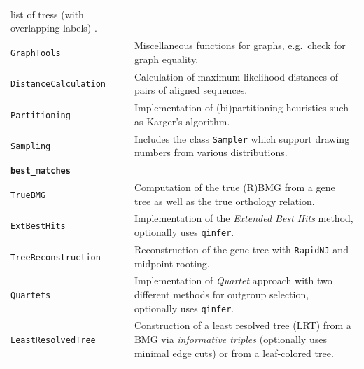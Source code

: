 \documentclass[hidelinks,11pt]{article}
\begin{document}
{\begin{longtable}{| p{4.0cm} | p{10cm} |}
	list of tress (with overlapping labels) \citep{deng2016}. \\
	\texttt{GraphTools} &
	Miscellaneous functions for graphs, e.g.\ check for graph equality. \\
	\texttt{DistanceCalculation} &
	Calculation of maximum likelihood distances of pairs of aligned sequences. \\
  \texttt{Partitioning} &
  Implementation of (bi)partitioning heuristics such as Karger's algorithm. \\
  \texttt{Sampling} &
  Includes the class \texttt{Sampler} which support drawing numbers from 
  various distributions. \\
	\hline
	\multicolumn{2}{|l|}{\textbf{\texttt{best\_matches}}}\\
	\hline
	\texttt{TrueBMG} &
	Computation of the true (R)BMG from a gene tree as well as the true orthology relation. \\
	\texttt{ExtBestHits} &
	Implementation of the \emph{Extended Best Hits} method, optionally uses \texttt{qinfer}. \\
	\texttt{TreeReconstruction} &
	Reconstruction of the gene tree with \texttt{RapidNJ} \citep{simonsen2008} and midpoint rooting. \\
	\texttt{Quartets} &
	Implementation of \emph{Quartet} approach with two different methods for outgroup selection, optionally uses \texttt{qinfer}. \\
	\texttt{LeastResolvedTree} &
	Construction of a least resolved tree (LRT) from a BMG via \emph{informative triples} (optionally uses minimal edge cuts) or from a leaf-colored tree. \\

\end{longtable}}
\end{document}
